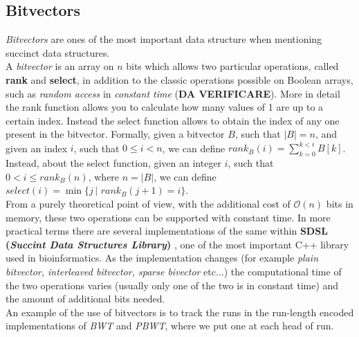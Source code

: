\documentclass[a4paper,11pt, oneside]{article}
\begin{document}
\subsection*{Bitvectors}
\textit{Bitvectors} are ones of the most important data structure when
mentioning succinct data structures. \\
A \textit{bitvector} is an array on $n$ bits which allows two particular
operations, called \textbf{rank} and \textbf{select}, in addition to the classic
operations possible on Boolean arrays, such as \textit{random access} in
\textit{constant time} (\textbf{DA VERIFICARE}). More in detail the rank
function allows you to calculate how many values of 1 are up to a certain
index. Instead the select function allows to obtain the index of any one present
in the bitvector. Formally, given a bitvector $B$, such that $|B|=n$, and given
an index $i$, such that $0\leq i<n$, we can define $rank_B(i)=\sum_{k=0}^{k<i}
B[k]$. Instead, about the select function, given an integer $i$, such that
$0<i\leq rank_B(n)$, where $n=|B|$,  we can define $select(i)=\min\{j \,| \,\,
rank_B(j+1)=i\}$.\\
From a purely theoretical point of view, with the additional cost of
$\mathcal{O}(n)$ bits in memory, these two operations can be supported with
constant time.  In more practical terms there are several implementations of the
same within \textbf{SDSL (\textit{Succint Data Structures Library})}
\cite{sdsl}, one of the most important C++ library used in bioinformatics. As
the implementation changes (for example \textit{plain bitvector, interleaved
  bitvector, sparse bivector} etc$\ldots$) the computational time of the two
operations varies (usually only one of the two is in constant time) and the
amount of additional bits needed.\\
An example of the use of bitvectors is to track the runs in the run-length
encoded implementations of \textit{BWT} and \textit{PBWT}, where we put one at
each head of run.
\end{document}
